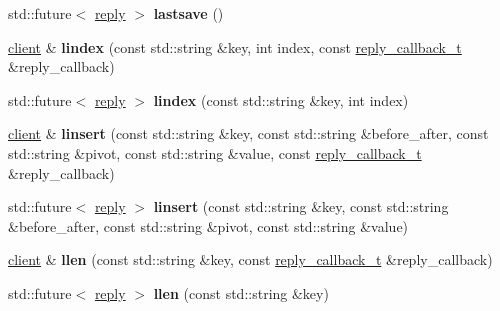 \begin{DoxyCompactItemize}
std\+::future$<$ \hyperlink{classcpp__redis_1_1reply}{reply} $>$ {\bfseries lastsave} ()
\item 
\mbox{\label{classcpp__redis_1_1client_afa409d5b28466837137dfb12c3554070}} 
\hyperlink{classcpp__redis_1_1client}{client} \& {\bfseries lindex} (const std\+::string \&key, int index, const \hyperlink{classcpp__redis_1_1client_a061a1140d36d2eaeda82b09a0bb3f9f2}{reply\+\_\+callback\+\_\+t} \&reply\+\_\+callback)
\item 
\mbox{\label{classcpp__redis_1_1client_a58458ef30b1fb49584395b6f8584b931}} 
std\+::future$<$ \hyperlink{classcpp__redis_1_1reply}{reply} $>$ {\bfseries lindex} (const std\+::string \&key, int index)
\item 
\mbox{\label{classcpp__redis_1_1client_a80799f12e6aafe07872b2bbea453db53}} 
\hyperlink{classcpp__redis_1_1client}{client} \& {\bfseries linsert} (const std\+::string \&key, const std\+::string \&before\+\_\+after, const std\+::string \&pivot, const std\+::string \&value, const \hyperlink{classcpp__redis_1_1client_a061a1140d36d2eaeda82b09a0bb3f9f2}{reply\+\_\+callback\+\_\+t} \&reply\+\_\+callback)
\item 
\mbox{\label{classcpp__redis_1_1client_ab8d167d78e3c956fd1ade0e2f992f46a}} 
std\+::future$<$ \hyperlink{classcpp__redis_1_1reply}{reply} $>$ {\bfseries linsert} (const std\+::string \&key, const std\+::string \&before\+\_\+after, const std\+::string \&pivot, const std\+::string \&value)
\item 
\mbox{\label{classcpp__redis_1_1client_a2e0a911a6bb87224896b7c33da7ac058}} 
\hyperlink{classcpp__redis_1_1client}{client} \& {\bfseries llen} (const std\+::string \&key, const \hyperlink{classcpp__redis_1_1client_a061a1140d36d2eaeda82b09a0bb3f9f2}{reply\+\_\+callback\+\_\+t} \&reply\+\_\+callback)
\item 
\mbox{\label{classcpp__redis_1_1client_a2890fccb9efd08b38195c8fb5fd1651e}} 
std\+::future$<$ \hyperlink{classcpp__redis_1_1reply}{reply} $>$ {\bfseries llen} (const std\+::string \&key)
\item 
\mbox{\label{classcpp__redis_1_1client_ad4060807b9b9aa330ad11dedd69e80b8}} 

\end{DoxyCompactItemize}
